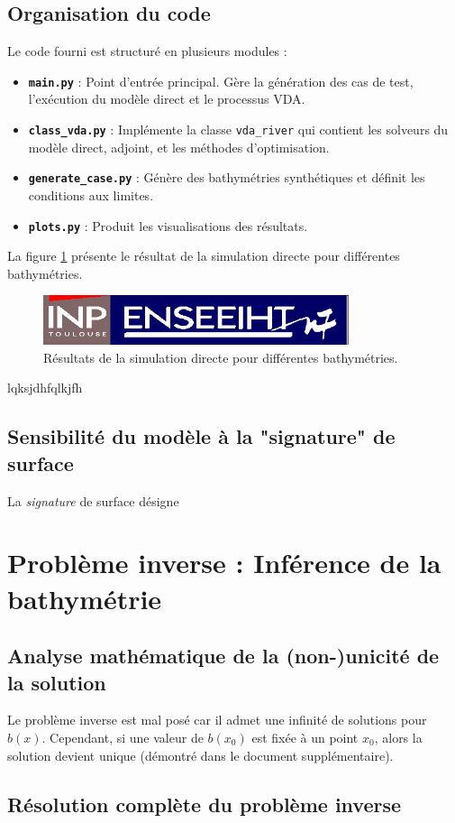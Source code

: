 \documentclass[12pt,a4paper]{article}
\begin{document}
\subsection{Organisation du code}
Le code fourni est structuré en plusieurs modules :
\begin{itemize}
    \item \textbf{\texttt{main.py}} : Point d'entrée principal. Gère la génération des cas de test, l'exécution du modèle direct et le processus VDA.
    \item \textbf{\texttt{class\_vda.py}} : Implémente la classe \texttt{vda\_river} qui contient les solveurs du modèle direct, adjoint, et les méthodes d'optimisation.
    \item \textbf{\texttt{generate\_case.py}} : Génère des bathymétries synthétiques et définit les conditions aux limites.
    \item \textbf{\texttt{plots.py}} : Produit les visualisations des résultats.
\end{itemize}


La figure \ref{fig:direct_model} présente le résultat de la simulation directe pour différentes bathymétries.

\begin{figure}[H]
    \centering
    \includegraphics[width=0.8\textwidth]{src/direct_model.png}
    \caption{Résultats de la simulation directe pour différentes bathymétries.}
    \label{fig:direct_model}
\end{figure}

lqksjdhfqlkjfh

\subsection{Sensibilité du modèle à la "signature" de surface}

La \textit{signature} de surface désigne 


\section{Problème inverse : Inférence de la bathymétrie}
\subsection{Analyse mathématique de la (non-)unicité de la solution}

Le problème inverse est mal posé car il admet une infinité de solutions pour $b(x)$.
Cependant, si une valeur de $b(x_0)$ est fixée à un point $x_0$, alors la solution devient unique (démontré dans le document supplémentaire).


\subsection{Résolution complète du problème inverse}
\end{document}
